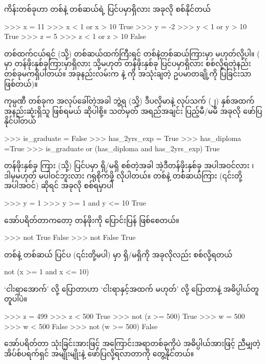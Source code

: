 ကိန်းတစ်ခုဟာ တစ်နဲ့ တစ်ဆယ်ရဲ့ ပြင်ပမှာရှိလား အခုလို စစ်နိုင်တယ်
\begin{codetxt}
>>> x = 11
>>> x < 1 or x > 10
True
>>> y = -2
>>> y < 1 or y > 10
True
>>> z = 5
>>> z < 1 or z > 10
False
\end{codetxt}
တစ်ထက်ငယ်ရင် (သို့) တစ်ဆယ်ထက်ကြီးရင် တစ်နဲ့တစ်ဆယ်ကြားမှာ မဟုတ်လို့ပါ။ ( မှာ တန်ဖိုးနှစ်ခုကြားမှာရှိလား သို့မဟုတ် တန်ဖိုးနှစ်ခု ပြင်ပမှာရှိလား စစ်လို့ရတဲ့နည်း တစ်ခုမကရှိပါတယ်။ အခုနည်းလမ်းက  နဲ့  ကို အသုံးချတဲ့ ဥပမာတချို့ကို ပြခြင်းသာဖြစ်တယ်)။ 

ကုမ္ပဏီ တစ်ခုက အလုပ်ခေါ်တဲ့အခါ ဘွဲ့ရ (သို့) ဒီပလိုမာနဲ့ လုပ်သက် (၂) နှစ်အထက် အနည်းဆုံးရှိသူ ဖြစ်ရမယ် ဆိုပါစို့။ သတ်မှတ် အရည်အချင်း ပြည့်မီ/မမီ အခုလို ဖော်ပြနိုင်ပါတယ်
\begin{codetxt}
>>> is_graduate = False
>>> has_2yrs_exp = True
>>> has_diploma =True
>>> is_graduate or (has_diploma and has_2yrs_exp)
True
\end{codetxt}


တန်ဖိုးနှစ်ခု ကြား (သို့) ပြင်ပမှာ ရှိ/မရှိ စစ်တဲ့အခါ အဲ့ဒီတန်ဖိုးနှစ်ခု အပါအဝင်လား ၊ ဒါမှမဟုတ် မပါဝင်ဘူးလား  ဂရုစိုက်ဖို့ လိုပါတယ်။ တစ်နဲ့ တစ်ဆယ်ကြား (၎င်းတို့ အပါအဝင်) ဆိုရင် အခုလို စစ်ရမှာပါ
\begin{codetxt}
>>> y = 1
>>> y >= 1 and y <= 10
True
\end{codetxt}

 အော်ပရိတ်တာကတော့  တန်ဖိုးကို ပြောင်းပြန် ဖြစ်စေတယ်။
\begin{codetxt}
>>> not True
False
>>> not False
True
\end{codetxt}
တစ်နဲ့ တစ်ဆယ် ပြင်ပ (၎င်းတို့မပါ) မှာ ရှိ/မရှိကို အခုလိုလည်း စစ်လို့ရတယ်
\begin{codetxt}
not (x >= 1 and x <= 10)
\end{codetxt}
‘ငါးရာအောက်’ လို့ ပြောတာဟာ ‘ငါးရာနှင့်အထက် မဟုတ်’ လို့ ပြောတာနဲ့ အဓိပ္ပါယ်တူတူပါပဲ။
\begin{codetxt}
>>> z = 499
>>> z < 500
True
>>> not (z >= 500)
True
>>> w = 500
>>> w < 500
False
>>> not (w >= 500)
False
\end{codetxt}
 အော်ပရိတ်တာ သုံးခြင်းအားဖြင့် အကြောင်းအရာတစ်ခုကိုပဲ အဓိပ္ပါယ်အားဖြင့် ညီမျှတဲ့ အိပ်စ်ပရက်ရှင် အမျိုးမျိုးနဲ့ ဖော်ပြလို့ရလာတာကို တွေ့နိုင်တယ်။ 

\afterpage{\blankpage}